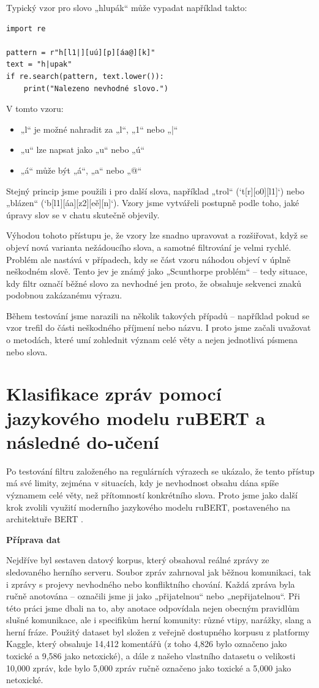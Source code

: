 \documentclass[FM,Proj]{tulthesis}
\begin{document}
Typický vzor pro slovo „hlupák“ může vypadat například takto:
\begin{verbatim}
import re

pattern = r"h[l1|][uú][p][áa@][k]"
text = "h|upak"
if re.search(pattern, text.lower()):
    print("Nalezeno nevhodné slovo.")
\end{verbatim}
V tomto vzoru:
\begin{itemize}
    \item „l“ je možné nahradit za „l“, „1“ nebo „|“
    \item „u“ lze napsat jako „u“ nebo „ú“
    \item „á“ může být „á“, „a“ nebo „@“
\end{itemize}
Stejný princip jsme použili i pro další slova, například „trol“ (`t[r][o0][l1]`) nebo „blázen“ (`b[l1][áa][z2][eě][n]`). Vzory jsme vytvářeli postupně podle toho, jaké úpravy slov se v chatu skutečně objevily.

Výhodou tohoto přístupu je, že vzory lze snadno upravovat a rozšiřovat, když se objeví nová varianta nežádoucího slova, a samotné filtrování je velmi rychlé. Problém ale nastává v případech, kdy se část vzoru náhodou objeví v úplně neškodném slově. Tento jev je známý jako „Scunthorpe problém“ – tedy situace, kdy filtr označí běžné slovo za nevhodné jen proto, že obsahuje sekvenci znaků podobnou zakázanému výrazu.

Během testování jsme narazili na několik takových případů – například pokud se vzor trefil do části neškodného příjmení nebo názvu. I proto jsme začali uvažovat o metodách, které umí zohlednit význam celé věty a nejen jednotlivá písmena nebo slova.
\section{ Klasifikace zpráv pomocí jazykového modelu ruBERT a následné do-učení}\label{deklarace}
Po testování filtru založeného na regulárních výrazech se ukázalo, že tento přístup má své limity, zejména v situacích, kdy je nevhodnost obsahu dána spíše významem celé věty, než přítomností konkrétního slova. Proto jsme jako další krok zvolili využití moderního jazykového modelu ruBERT, postaveného na architektuře BERT \cite{devlin2018bert}.

\textbf{Příprava dat}

Nejdříve byl sestaven datový korpus, který obsahoval reálné zprávy ze sledovaného herního serveru. Soubor zpráv zahrnoval jak běžnou komunikaci, tak i zprávy s projevy nevhodného nebo konfliktního chování. Každá zpráva byla ručně anotována – označili jsme ji jako „přijatelnou“ nebo „nepřijatelnou“. Při této práci jsme dbali na to, aby anotace odpovídala nejen obecným pravidlům slušné komunikace, ale i specifikům herní komunity: různé vtipy, narážky, slang a herní fráze. Použitý dataset byl složen z veřejně dostupného korpusu z platformy Kaggle, který obsahuje 14,412 komentářů (z toho 4,826 bylo označeno jako toxické a 9,586 jako netoxické), a dále z našeho vlastního datasetu o velikosti 10,000 zpráv, kde bylo 5,000 zpráv ručně označeno jako toxické a 5,000 jako netoxické.
\end{document}
